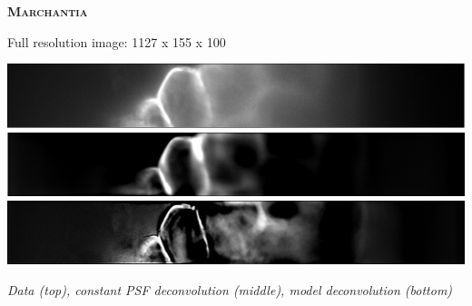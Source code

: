 \documentclass[a0paper,portrait,fontscale=0.35]{baposter}
\newcommand{\mycaption}[1]{
  {
    \smaller
    \emph{#1}
  }
}
\theoremstyle{plain}
\theoremstyle{plain}
\theoremstyle{definition}
\theoremstyle{plain}
\theoremstyle{definition}
\begin{document}
\begin{poster}
{\begin{minipage}[t]{0.51\textwidth}
  \end{minipage}
  \begin{minipage}[t]{0.48\textwidth}
    \begin{center}
      \larger
      \textbf{\textsc{Marchantia}}
    \end{center}


    \begin{minipage}[t]{0.49\textwidth}
      Full resolution image: 1127 x 155 x 100

    \end{minipage}
    \begin{minipage}[t]{0.49\textwidth}
      \centering
      \includegraphics[width=\textwidth]{img/f_xy1.png}
      \includegraphics[width=\textwidth]{img/urec_h_xy1.png}
      \includegraphics[width=\textwidth]{img/m_urec_it700_lam0p1_xy1.png}

      \begin{center}
        \mycaption{
          Data (top), constant PSF deconvolution (middle),
          model deconvolution (bottom)
        }
      \end{center}


\end{minipage}
\end{minipage}}
\end{poster}
\end{document}

